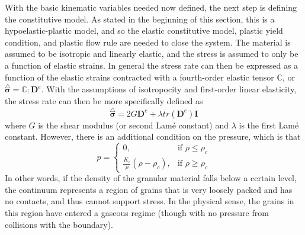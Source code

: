 With the basic kinematic variables needed now defined, the next step is defining the constitutive model. As stated in the beginning of this section, this is a hypoelastic-plastic model, and so the elastic constitutive model, plastic yield condition, and plastic flow rule are needed to close the system. The material is assumed to be isotropic and linearly elastic, and the stress is assumed to only be a function of elastic strains. In general the stress rate can then be expressed as a function of the elastic strains contracted with a fourth-order elastic tensor $\mathbb{C}$, or $\stackrel{\triangle}{\bm{\sigma}}=\mathbb{C}:\bm{D}^e$. With the assumptions of isotropocity and first-order linear elasticity, the stress rate can then be more specifically defined as
\begin{equation}
\stackrel{\triangle}{\bm{\sigma}}=2G\bm{D}^e+\lambda tr(\bm{D}^e)\bm{I}\label{constitutive}
\end{equation}
where $G$ is the shear modulus (or second Lam\'e constant) and $\lambda$ is the first Lam\'e constant. However, there is an additional condition on the pressure, which is that
\begin{equation}
	p=
\begin{cases}
	0,							 & \text{if } \rho \leq \rho_c \\
	\frac{K_c}{\rho}(\rho-\rho_c),& \text{if } \rho \geq \rho_c
\end{cases}
\label{pressure_state}
\end{equation}
In other words, if the density of the granular material falls below a certain level, the continuum represents a region of grains that is very loosely packed and has no contacts, and thus cannot support stress. In the physical sense, the grains in this region have entered a gaseous regime (though with no pressure from collisions with the boundary).

